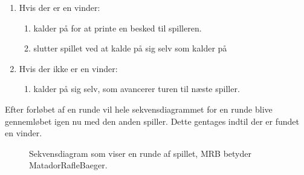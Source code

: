 \begin{enumerate}
\begin{enumerate}
\begin{enumerate}
\end{enumerate}
\end{enumerate}
\begin{enumerate}
\item Hvis der er en vinder:
\begin{enumerate}
\item {} kalder  på  for at printe en besked til spilleren.
\item {} slutter spillet ved at kalde  på sig selv som kalder  på 
\end{enumerate}
\item Hvis der ikke er en vinder:
\begin{enumerate}
\item {} kalder  på sig selv, som avancerer turen til næste spiller.
\end{enumerate}
\end{enumerate}
\end{enumerate}

Efter forløbet af en runde vil hele sekvensdiagrammet for en runde blive gennemløbet igen nu med den anden spiller. Dette gentages indtil der er fundet en vinder.

\begin{figure}
\centering
\caption{Sekvensdiagram som viser en runde af spillet, MRB betyder MatadorRafleBaeger.}\label{fig:tikzSekvensGame8}
\end{figure}

\FloatBarrier